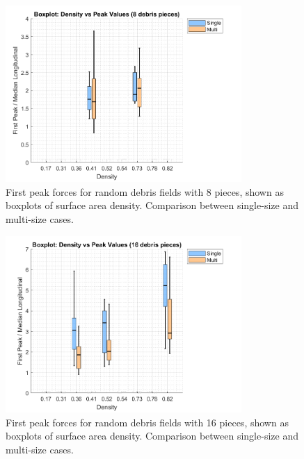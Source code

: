 \documentclass{article}
\begin{document}
\begin{figure}[htbp]
    \centering
    \includegraphics[width=0.8\textwidth]{Boxplot_Density_vs_PeakValues_8Debris.png}
    \caption{First peak forces for random debris fields with 8 pieces, shown as boxplots of surface area density. Comparison between single-size and multi-size cases.}
    \label{fig:boxplot_8}
\end{figure}

\begin{figure}[htbp]
    \centering
    \includegraphics[width=0.8\textwidth]{Boxplot_Density_vs_PeakValues_16Debris.png}
    \caption{First peak forces for random debris fields with 16 pieces, shown as boxplots of surface area density. Comparison between single-size and multi-size cases.}
    \label{fig:boxplot_16}
\end{figure}
\end{document}
